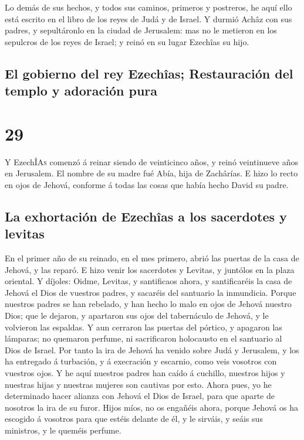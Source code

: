  Lo demás de sus hechos, y todos sus caminos, primeros y
postreros, he aquí ello está escrito en el libro de los reyes de Judá y
de Israel.  Y durmió Achâz con sus padres, y sepultáronlo
en la ciudad de Jerusalem: mas no le metieron en los sepulcros de los
reyes de Israel; y reinó en su lugar Ezechîas su hijo.

\hypertarget{el-gobierno-del-rey-ezechuxeeas-restauraciuxf3n-del-templo-y-adoraciuxf3n-pura}{%
\subsection{El gobierno del rey Ezechîas; Restauración del templo y
adoración
pura}\label{el-gobierno-del-rey-ezechuxeeas-restauraciuxf3n-del-templo-y-adoraciuxf3n-pura}}

\hypertarget{section-28}{%
\section{29}\label{section-28}}

 Y EzechÎ\textsc{As} comenzó á reinar siendo de
veinticinco años, y reinó veintinueve años en Jerusalem. El nombre de su
madre fué Abía, hija de Zachârías.  E hizo lo recto en
ojos de Jehová, conforme á todas las cosas que había hecho David su
padre.

\hypertarget{la-exhortaciuxf3n-de-ezechuxeeas-a-los-sacerdotes-y-levitas}{%
\subsection{La exhortación de Ezechîas a los sacerdotes y
levitas}\label{la-exhortaciuxf3n-de-ezechuxeeas-a-los-sacerdotes-y-levitas}}

 En el primer año de su reinado, en el mes primero, abrió
las puertas de la casa de Jehová, y las reparó.  E hizo
venir los sacerdotes y Levitas, y juntólos en la plaza oriental.
 Y díjoles: Oidme, Levitas, y santificaos ahora, y
santificaréis la casa de Jehová el Dios de vuestros padres, y sacaréis
del santuario la inmundicia.  Porque nuestros padres se
han rebelado, y han hecho lo malo en ojos de Jehová nuestro Dios; que le
dejaron, y apartaron sus ojos del tabernáculo de Jehová, y le volvieron
las espaldas.  Y aun cerraron las puertas del pórtico, y
apagaron las lámparas; no quemaron perfume, ni sacrificaron holocausto
en el santuario al Dios de Israel.  Por tanto la ira de
Jehová ha venido sobre Judá y Jerusalem, y los ha entregado á turbación,
y á execración y escarnio, como veis vosotros con vuestros ojos.
 Y he aquí nuestros padres han caído á cuchillo, nuestros
hijos y nuestras hijas y nuestras mujeres son cautivas por esto.
 Ahora pues, yo he determinado hacer alianza con Jehová
el Dios de Israel, para que aparte de nosotros la ira de su furor.
 Hijos míos, no os engañéis ahora, porque Jehová os ha
escogido á vosotros para que estéis delante de él, y le sirváis, y seáis
sus ministros, y le queméis perfume.

